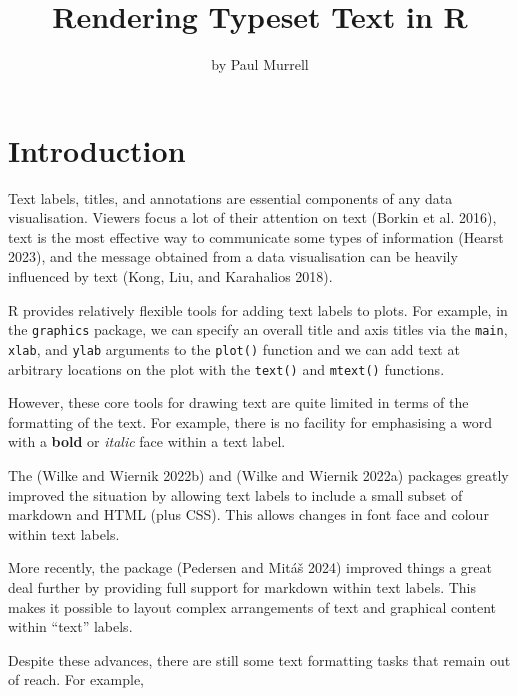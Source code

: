 \title{Rendering Typeset Text in R}


\author{by Paul Murrell}

\maketitle


\hypertarget{introduction}{%
\section{Introduction}\label{introduction}}

Text labels, titles, and annotations are essential components of
any data visualisation. Viewers focus a lot of their attention
on text (Borkin et al. 2016),
text is the most effective way to communicate some types of
information (Hearst 2023),
and the message obtained from a data visualisation can be
heavily influenced by text (Kong, Liu, and Karahalios 2018).

R provides relatively flexible tools for adding text labels to plots.
For example, in the \texttt{graphics} package, we can specify an
overall title and axis titles via the \texttt{main},
\texttt{xlab}, and \texttt{ylab} arguments to the \texttt{plot()} function
and we can add text at arbitrary locations on the plot with the \texttt{text()}
and \texttt{mtext()} functions.

However, these core tools for drawing text are quite limited
in terms of the formatting of the text.
For example, there is no facility for emphasising a word with
a \textbf{bold} or \emph{italic} face within a text label.

The  (Wilke and Wiernik 2022b) and  (Wilke and Wiernik 2022a)
packages greatly improved the situation by allowing text labels
to include a small subset of
markdown and HTML (plus CSS). This allows changes in font face
and colour within text labels.

More recently, the  package (Pedersen and Mitáš 2024)
improved things a great deal further by providing full support for
markdown within text labels. This makes it possible to layout
complex arrangements of text and graphical content within ``text'' labels.

Despite these advances, there are still some text formatting tasks that
remain out of reach. For example,

